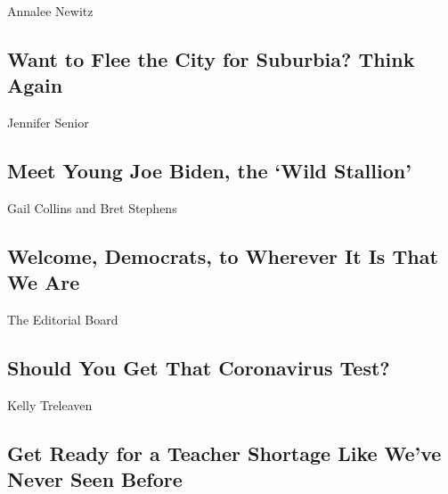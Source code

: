 Annalee Newitz

\hypertarget{want-to-flee-the-city-for-suburbia-think-again}{%
\subsection{Want to Flee the City for Suburbia? Think
Again}\label{want-to-flee-the-city-for-suburbia-think-again}}

\href{/2020/08/15/opinion/joe-biden-2020-1988-what-it-takes.html}{}

Jennifer Senior

\hypertarget{meet-young-joe-biden-the-wild-stallion}{%
\subsection{Meet Young Joe Biden, the `Wild
Stallion'}\label{meet-young-joe-biden-the-wild-stallion}}

\href{/2020/08/17/opinion/trump-biden-harris-democratic-convention.html}{}

Gail Collins and Bret Stephens

\hypertarget{welcome-democrats-to-wherever-it-is-that-we-are}{%
\subsection{Welcome, Democrats, to Wherever It Is That We
Are}\label{welcome-democrats-to-wherever-it-is-that-we-are}}

\href{/2020/08/16/opinion/us-coronavirus-testing.html}{}

The Editorial Board

\hypertarget{should-you-get-that-coronavirus-test}{%
\subsection{Should You Get That Coronavirus
Test?}\label{should-you-get-that-coronavirus-test}}

\href{/2020/08/17/opinion/coronavirus-schools-teachers.html}{}

Kelly Treleaven

\hypertarget{get-ready-for-a-teacher-shortage-like-weve-never-seen-before}{%
\subsection{Get Ready for a Teacher Shortage Like We've Never Seen
Before}\label{get-ready-for-a-teacher-shortage-like-weve-never-seen-before}}

